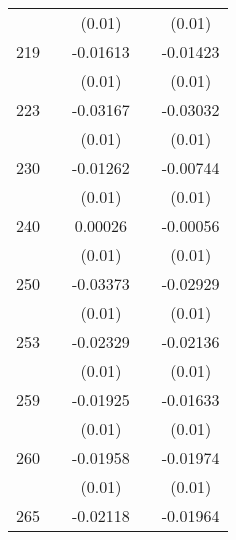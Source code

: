 \begin{table}[htbp]
\begin{tabular}{l*{4}{c}}
                    &                     &      (0.01)         &                     &      (0.01)         \\
219                 &                     &    -0.01613\sym{*}  &                     &    -0.01423         \\
                    &                     &      (0.01)         &                     &      (0.01)         \\
223                 &                     &    -0.03167\sym{**} &                     &    -0.03032\sym{**} \\
                    &                     &      (0.01)         &                     &      (0.01)         \\
230                 &                     &    -0.01262         &                     &    -0.00744         \\
                    &                     &      (0.01)         &                     &      (0.01)         \\
240                 &                     &     0.00026         &                     &    -0.00056         \\
                    &                     &      (0.01)         &                     &      (0.01)         \\
250                 &                     &    -0.03373\sym{***}&                     &    -0.02929\sym{**} \\
                    &                     &      (0.01)         &                     &      (0.01)         \\
253                 &                     &    -0.02329\sym{**} &                     &    -0.02136\sym{**} \\
                    &                     &      (0.01)         &                     &      (0.01)         \\
259                 &                     &    -0.01925\sym{**} &                     &    -0.01633\sym{*}  \\
                    &                     &      (0.01)         &                     &      (0.01)         \\
260                 &                     &    -0.01958         &                     &    -0.01974         \\
                    &                     &      (0.01)         &                     &      (0.01)         \\
265                 &                     &    -0.02118\sym{***}&                     &    -0.01964\sym{**} \\

\end{tabular}
\end{table}
